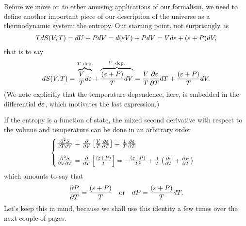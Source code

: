 Before we move on to other amusing applications of our formalism, we need to define
another important piece of our description of the universe as a thermodynamic system:
the entropy. Our starting point, not surprisingly, is
\begin{align*}
  T dS(V, T) = dU + P dV = d(\varepsilon V) + P dV =
  V d\varepsilon + (\varepsilon + P) dV,
\end{align*}
that is to say
\begin{align*}
  dS(V, T) =
  \overbrace{\frac{V}{T} d\varepsilon}^{T~\text{dep.}} +
  \overbrace{\frac{(\varepsilon + P)}{T} dV}^{V~\text{dep.}} =
  \frac{V}{T} \pdv{\varepsilon}{T} dT + \frac{(\varepsilon + P)}{T} dV.
\end{align*}
(We note explicitly that the temperature dependence, here, is embedded in the
differential $d\varepsilon$, which motivates the last expression.)

If the entropy is a function of state, the mixed second derivative with respect to
the volume and temperature can be done in an arbitrary order
\begin{align*}
  \begin{cases}
  \pdv[2]{S}{T}{V} = \pdv{}{V} \left[ \frac{V}{T}\pdv{\varepsilon}{T} \right] =
  \frac{1}{T}\pdv{\varepsilon}{T}\\[10pt]
  \pdv[2]{S}{V}{T} = \pdv{}{T} \left[ \frac{(\varepsilon + P)}{T} \right] =
  -\frac{(\varepsilon + P)}{T^2} +
  \frac{1}{T} \left( \pdv{\varepsilon}{T} + \pdv{\ensuremath{P}}{T} \right)
  \end{cases}
\end{align*}
which amounts to say that
\begin{align}\label{eq:dpt_entropy}
  \pdv{\ensuremath{P}}{T} = \frac{(\varepsilon + P)}{T} \quad\text{or}\quad
  dP = \frac{(\varepsilon + P)}{T} dT.
\end{align}
Let's keep this in mind, because we shall use this identity a few times over the
next couple of pages.

